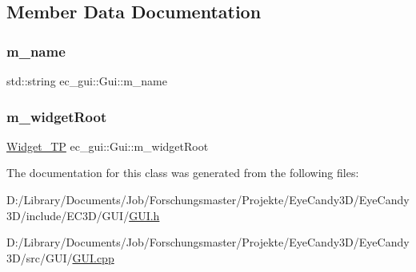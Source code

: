 \subsection{Member Data Documentation}
\mbox{\label{classec__gui_1_1_gui_a2d2b9975b1375f9bb0d799877d8fc76a}} 
\subsubsection{\texorpdfstring{m\+\_\+name}{m\_name}}
{\footnotesize\ttfamily std\+::string ec\+\_\+gui\+::\+Gui\+::m\+\_\+name\hspace{0.3cm}{\ttfamily [protected]}}

\mbox{\label{classec__gui_1_1_gui_afc73c5c8b07c8ee9eb01ce84b5d0d748}} 
\subsubsection{\texorpdfstring{m\+\_\+widget\+Root}{m\_widgetRoot}}
{\footnotesize\ttfamily \mbox{\hyperlink{classec__gui_1_1_gui_af2df87aa1795fe5b141e1137084f7822}{Widget\+\_\+\+TP}} ec\+\_\+gui\+::\+Gui\+::m\+\_\+widget\+Root\hspace{0.3cm}{\ttfamily [protected]}}



The documentation for this class was generated from the following files\+:\begin{DoxyCompactItemize}
\item 
D\+:/\+Library/\+Documents/\+Job/\+Forschungsmaster/\+Projekte/\+Eye\+Candy3\+D/\+Eye\+Candy3\+D/include/\+E\+C3\+D/\+G\+U\+I/\mbox{\hyperlink{_g_u_i_8h}{G\+U\+I.\+h}}\item 
D\+:/\+Library/\+Documents/\+Job/\+Forschungsmaster/\+Projekte/\+Eye\+Candy3\+D/\+Eye\+Candy3\+D/src/\+G\+U\+I/\mbox{\hyperlink{_g_u_i_8cpp}{G\+U\+I.\+cpp}}\end{DoxyCompactItemize}

